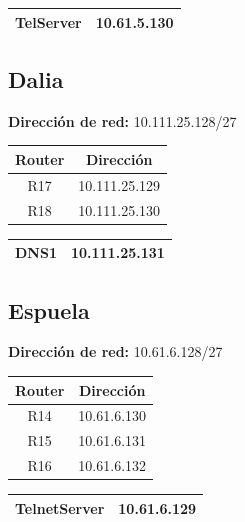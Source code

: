 \begin{table}[!htbp]
\centering
  \begin{tabular}{|c|c|}
    \hline
	TelServer& 10.61.5.130 \\
    \hline
  \end{tabular}
\end{table}

\subsection{Dalia}
\textbf{Dirección de red:} 10.111.25.128/27
\begin{table}[!htbp]
\centering
  \begin{tabular}{|c|c|}
    \hline
	Router & Dirección\\ \hline
	R17 & 10.111.25.129\\ \hline
	R18 & 10.111.25.130\\
    \hline
  \end{tabular}
\end{table}

\begin{table}[!htbp]
\centering
  \begin{tabular}{|c|c|}
    \hline
	DNS1& 10.111.25.131 \\
    \hline
  \end{tabular}
\end{table}

\subsection{Espuela}
\textbf{Dirección de red:} 10.61.6.128/27
\begin{table}[!htbp]
\centering
  \begin{tabular}{|c|c|}
    \hline
	Router & Dirección\\ \hline
	R14 & 10.61.6.130\\ \hline
	R15 & 10.61.6.131\\ \hline
	R16 & 10.61.6.132\\
    \hline
  \end{tabular}
\end{table}

\begin{table}[!htbp]
\centering
  \begin{tabular}{|c|c|}
    \hline
	TelnetServer& 10.61.6.129 \\
    \hline
  \end{tabular}
\end{table}

